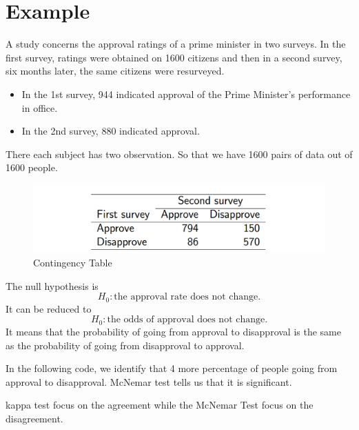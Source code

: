 \section{Example}
A study concerns the approval ratings of a prime minister in two
surveys.
In the first survey, ratings were obtained on 1600 citizens and
then in a second survey, six months later, the same citizens were
resurveyed.

\begin{itemize}
	\item In the 1st survey, 944 indicated approval of the Prime Minister's
	performance in office.
	\item In the 2nd survey, 880 indicated approval.
\end{itemize}

There each subject has two observation. So that we have 1600 pairs of data out of 1600 people.

\begin{figure}[H]
	\centering
	\includegraphics[width=0.7\linewidth]{fig/screenshot010}
	\caption{Contingency Table}
	\label{fig:screenshot010}
\end{figure}

The null hypothesis is 
\[H_0: \text{the approval rate does not change.}\]
It can be reduced to
\[H_0: \text{the odds of approval does not change.}\]
It means that the probability of going from approval to disapproval is the
same as the probability of going from disapproval to approval.

In the following code, we identify that 4 more percentage of people going from approval to disapproval. McNemar test tells us that it is significant.



kappa test focus on the agreement while the McNemar Test focus on the disagreement.

